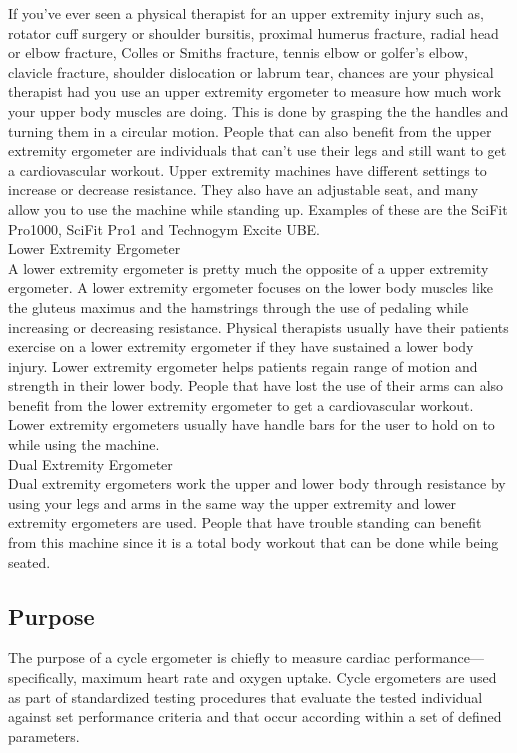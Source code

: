 \documentclass[12pt]{article}
\begin{document}
If you’ve ever seen a physical therapist for an upper extremity injury such as, rotator cuff surgery or shoulder bursitis, proximal humerus fracture, radial head or elbow fracture, Colles or Smiths fracture, tennis elbow or golfer’s elbow, clavicle fracture, shoulder dislocation or labrum tear, chances are your physical therapist had you use an upper extremity ergometer to measure how much work your upper body muscles are doing. This is done by grasping the the handles and turning them in a circular motion. People that can also benefit from the upper extremity ergometer are individuals that can’t use their legs and still want to get a cardiovascular workout. Upper extremity machines have different settings to increase or decrease resistance. They also have an adjustable seat, and many allow you to use the machine while standing up. Examples of these are the SciFit Pro1000, SciFit Pro1 and Technogym Excite UBE.\\

Lower Extremity Ergometer\\

A lower extremity ergometer is pretty much the opposite of a upper extremity ergometer. A lower extremity ergometer focuses on the lower body muscles like the gluteus maximus and the hamstrings through the use of pedaling while increasing or decreasing resistance. Physical therapists usually have their patients exercise on a lower extremity ergometer if they have sustained a lower body injury. Lower extremity ergometer helps patients regain range of motion and strength in their lower body. People that have lost the use of their arms can also benefit from the lower extremity ergometer to get a cardiovascular workout. Lower extremity ergometers usually have handle bars for the user to hold on to while using the machine.\\

Dual Extremity Ergometer\\

Dual extremity ergometers work the upper and lower body through resistance by using your legs and arms in the same way the upper extremity and lower extremity ergometers are used. People that have trouble standing can benefit from this machine since it is a total body workout that can be done while being seated.
\subsection{Purpose}
The purpose of a cycle ergometer is chiefly to measure cardiac performance—specifically, maximum heart rate and oxygen uptake. Cycle ergometers are used as part of standardized testing procedures that evaluate the tested individual against set performance criteria and that occur according within a set of defined parameters.
\end{document}
